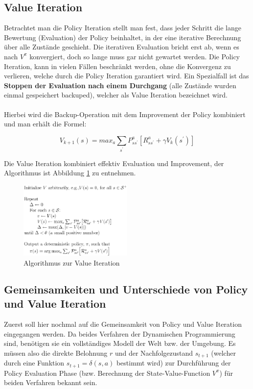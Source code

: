 \documentclass[10pt]{scrartcl}
\begin{document}
\subsection{Value Iteration}
Betrachtet man die Policy Iteration stellt man fest, dass jeder Schritt die lange Bewertung (Evaluation) der Policy beinhaltet, in der eine iterative Berechnung über alle Zustände geschieht. Die iterativen Evaluation bricht erst ab, wenn es nach $V^{\pi}$ konvergiert, doch so lange muss gar nicht gewartet werden. Die Policy Iteration, kann in vielen Fällen beschränkt werden, ohne die Konvergenz zu verlieren, welche durch die Policy Iteration garantiert wird. Ein Spezialfall ist das \textbf{Stoppen der Evaluation nach einem Durchgang} (alle Zustände wurden einmal gespeichert \glqq backuped\grqq\xspace), welcher als Value Iteration bezeichnet wird.\\
\\
Hierbei wird die Backup-Operation mit dem Improvement der Policy kombiniert und man erhält die Formel:

\begin{equation}
V_{k+1}(s) = max_{a} \sum_{s^{'}} P^a_{ss^{'}} [R^a_{ss^{'}} + \gamma V_{k} (s^{'})]
\end{equation}

Die Value Iteration kombiniert effektiv Evaluation und Improvement, der Algorithmus ist Abbildung \ref{fig:Value} zu entnehmen.

\begin{figure}[htbp]
	\centering	\includegraphics[width=0.5\textwidth]{Bilder/Value.png}
	\caption{Algorithmus zur Value Iteration}
	\label{fig:Value}
\end{figure}

\subsection{Gemeinsamkeiten und Unterschiede von Policy und Value Iteration}
\label{sec:dynamic_programming_unterschiede}
Zuerst soll hier nochmal auf die Gemeinsamkeit von Policy und Value Iteration eingegangen werden. 
Da beides Verfahren der Dynamischen Programmierung sind, benötigen sie ein vollständiges Modell der Welt bzw. der Umgebung.
Es müssen also die direkte Belohnung $r$ und der Nachfolgezustand $s_{t+1}$ (welcher durch eine Funktion $s_{t+1} = \delta(s,a)$ bestimmt wird) zur Durchführung der Policy Evaluation Phase (bzw. Berechnung der State-Value-Function $V^{\pi}$) für beiden Verfahren bekannt sein.
\end{document}
